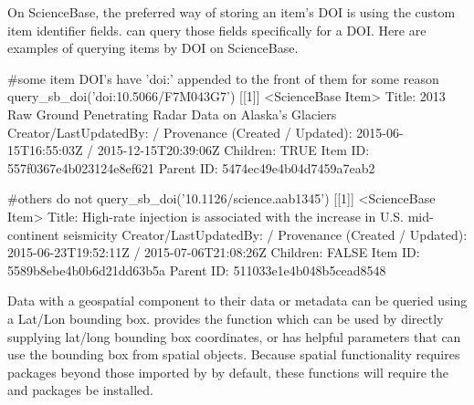 On ScienceBase, the preferred way of storing an item's DOI is using the custom item
identifier fields.  can query those fields specifically for 
a DOI. Here are examples of querying items by DOI on ScienceBase.
\begin{example}
#some item DOI's have 'doi:' appended to the front of them for some reason
query_sb_doi('doi:10.5066/F7M043G7')
[[1]]
<ScienceBase Item> 
  Title: 2013 Raw Ground Penetrating Radar Data on Alaska's Glaciers
  Creator/LastUpdatedBy:      / 
  Provenance (Created / Updated):  2015-06-15T16:55:03Z / 2015-12-15T20:39:06Z
  Children: TRUE
  Item ID: 557f0367e4b023124e8ef621
  Parent ID: 5474ec49e4b04d7459a7eab2
  
#others do not
query_sb_doi('10.1126/science.aab1345')
[[1]]
<ScienceBase Item> 
  Title: High-rate injection is associated with the increase in U.S. mid-continent seismicity
  Creator/LastUpdatedBy:      / 
  Provenance (Created / Updated):  2015-06-23T19:52:11Z / 2015-07-06T21:08:26Z
  Children: FALSE
  Item ID: 5589b8ebe4b0b6d21dd63b5a
  Parent ID: 511033e1e4b048b5cead8548
\end{example}

Data with a geospatial component to their data or metadata can be queried using a 
Lat/Lon bounding box.  provides the function 
which can be used by directly supplying lat/long bounding box coordinates, or has
helpful parameters that can use the bounding box from  spatial objects. Because
spatial functionality requires packages beyond those imported by  by default,
these functions will require the  and  packages be installed. 

